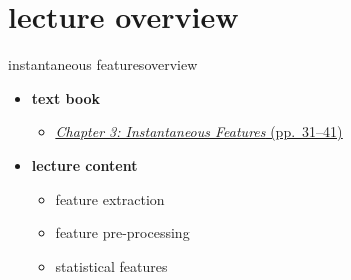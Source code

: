 

\subtitle{Part 4.1: Instantaneous Features~---~Introduction}


	

    \section[overview]{lecture overview}
        \begin{frame}{instantaneous features}{overview}
            \begin{itemize}
                \item   \textbf{text book}  
                    \begin{itemize}
                        \item   \href{http://ieeexplore.ieee.org/xpl/articleDetails.jsp?tp=&arnumber=6331120&}{\underline{\textit{Chapter 3: Instantaneous Features} (pp.~31--41)}}
                    \end{itemize}
                \bigskip
                \item<2->   \textbf{lecture content}
                    \begin{itemize}
                        \item<2->   feature extraction 
                        \item<3->   feature pre-processing
                        \item<4->   statistical features
                    \end{itemize}
            \end{itemize}
        \end{frame}

